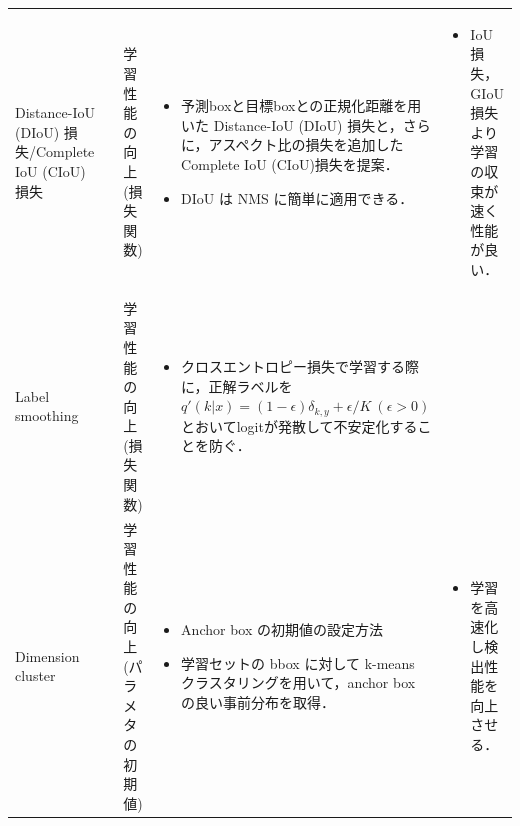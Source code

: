 \documentclass[twocolumn]{jsarticle} %
\begin{document}
\begin{table}
\begin{center}
\begin{tabularx}{\linewidth}{XcXp{7cm}X}
            Distance-IoU (DIoU) 損失/Complete IoU (CIoU)損失
            & \cite{ZWLLYR20} & 学習性能の向上 (損失関数) & 
            \begin{itemize}
                \vspace{-0.7\baselineskip}
                \setlength{\leftskip}{-3mm}
                \item 予測boxと目標boxとの正規化距離を用いた Distance-IoU (DIoU) 損失と，さらに，アスペクト比の損失を追加したComplete IoU (CIoU)損失を提案．
                \item DIoU は NMS に簡単に適用できる．
            \end{itemize}
            &
            \begin{itemize}
                \vspace{-0.7\baselineskip}
                \setlength{\leftskip}{-3mm}
                \item IoU損失，GIoU損失より学習の収束が速く性能が良い．
            \end{itemize}
            \\

            Label smoothing
            & \cite{SVISW16} & 学習性能の向上 (損失関数) & 
            \begin{itemize}
                \vspace{-0.7\baselineskip}
                \setlength{\leftskip}{-3mm}
                \item クロスエントロピー損失で学習する際に，正解ラベルを $q'(k|x){=}(1{-}\epsilon)\delta_{k,y}{+}\epsilon/K \ (\epsilon{>}0)$とおいてlogitが発散して不安定化することを防ぐ．
            \end{itemize}
            &
            \\

            Dimension cluster
            & \cite{RedFar17} & 学習性能の向上 (パラメタの初期値) & 
            \begin{itemize}
                \vspace{-0.7\baselineskip}
                \setlength{\leftskip}{-3mm}
                \item Anchor box の初期値の設定方法
                \item 学習セットの bbox に対して k-means クラスタリングを用いて，anchor box の良い事前分布を取得．
            \end{itemize}
            &
            \begin{itemize}
                \vspace{-0.7\baselineskip}
                \setlength{\leftskip}{-3mm}
                \item 学習を高速化し検出性能を向上させる．
            \end{itemize}
            \\


\end{tabularx}
\end{center}
\end{table}
\end{document}
